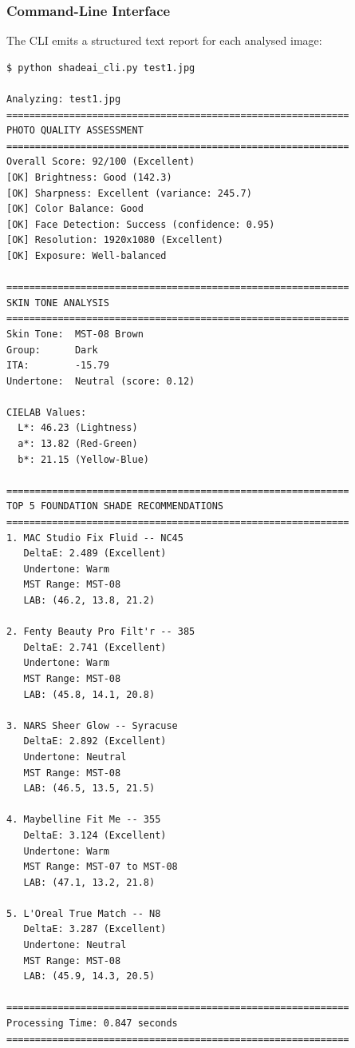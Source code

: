 \subsubsection{Command-Line Interface}

The CLI emits a structured text report for each analysed image:

\begin{verbatim}
$ python shadeai_cli.py test1.jpg

Analyzing: test1.jpg
============================================================
PHOTO QUALITY ASSESSMENT
============================================================
Overall Score: 92/100 (Excellent)
[OK] Brightness: Good (142.3)
[OK] Sharpness: Excellent (variance: 245.7)
[OK] Color Balance: Good
[OK] Face Detection: Success (confidence: 0.95)
[OK] Resolution: 1920x1080 (Excellent)
[OK] Exposure: Well-balanced

============================================================
SKIN TONE ANALYSIS
============================================================
Skin Tone:  MST-08 Brown
Group:      Dark
ITA:        -15.79
Undertone:  Neutral (score: 0.12)

CIELAB Values:
  L*: 46.23 (Lightness)
  a*: 13.82 (Red-Green)
  b*: 21.15 (Yellow-Blue)

============================================================
TOP 5 FOUNDATION SHADE RECOMMENDATIONS
============================================================
1. MAC Studio Fix Fluid -- NC45
   DeltaE: 2.489 (Excellent)
   Undertone: Warm
   MST Range: MST-08
   LAB: (46.2, 13.8, 21.2)

2. Fenty Beauty Pro Filt'r -- 385
   DeltaE: 2.741 (Excellent)
   Undertone: Warm
   MST Range: MST-08
   LAB: (45.8, 14.1, 20.8)

3. NARS Sheer Glow -- Syracuse
   DeltaE: 2.892 (Excellent)
   Undertone: Neutral
   MST Range: MST-08
   LAB: (46.5, 13.5, 21.5)

4. Maybelline Fit Me -- 355
   DeltaE: 3.124 (Excellent)
   Undertone: Warm
   MST Range: MST-07 to MST-08
   LAB: (47.1, 13.2, 21.8)

5. L'Oreal True Match -- N8
   DeltaE: 3.287 (Excellent)
   Undertone: Neutral
   MST Range: MST-08
   LAB: (45.9, 14.3, 20.5)

============================================================
Processing Time: 0.847 seconds
============================================================
\end{verbatim}

